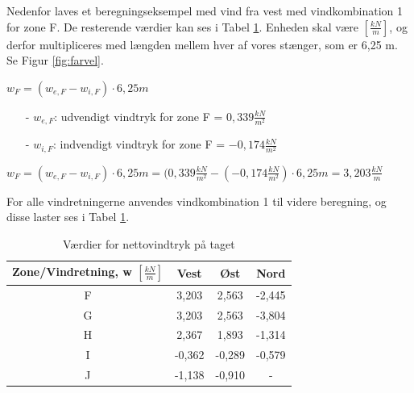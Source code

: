 Nedenfor laves et beregningseksempel med vind fra vest med vindkombination 1 for zone F. De resterende værdier kan ses i Tabel \ref{tab:bb}.
\newline
\newline
Enheden skal være $[\frac{kN}{m}]$, og derfor multipliceres med længden mellem hver af vores stænger, som er 6,25 m. Se Figur \ref{fig:farvel}.

\begin{center} 
	$w_F=(w_{e,F}-w_{i,F})\cdot 6,\!25 m$
\end{center}

\begin{itemize}
	\item[-] $w_{e,F}$: udvendigt vindtryk for zone F = $0,\!339 \frac{kN}{m^2}$
	\item[-] $w_{i,F}$: indvendigt vindtryk for zone F = $-0,\!174 \frac{kN}{m^2}$
\end{itemize}

\begin{center} 
	$w_F=(w_{e,F}-w_{i,F})\cdot 6,\!25 m = (0,\!339 \frac{kN}{m^2} - (-0,\!174 \frac{kN}{m^2})\cdot 6,\!25 m = 3,\!203 \frac{kN}{m}$
\end{center}

For alle vindretningerne anvendes vindkombination 1 til videre beregning, og disse laster ses i Tabel \ref{tab:bb}. 

\begin{table}[htb]
	\begin{center}
		\begin{tabular}{ |c|c|c|c| } 
			\hline
			Zone/Vindretning, w $[\frac{kN}{m}]$ & Vest & Øst & Nord \\	\hline
			F & 3,203 & 2,563 & -2,445 \\	\hline
			G & 3,203 & 2,563 & -3,804 \\	\hline 
			H & 2,367 & 1,893 & -1,314 \\ 	\hline
			I & -0,362 & -0,289 & -0,579 \\	\hline
			J & -1,138 & -0,910 & - \\	\hline
		\end{tabular}
		\caption{Værdier for nettovindtryk på taget}
		\label{tab:bb}
	\end{center}
\end{table}

